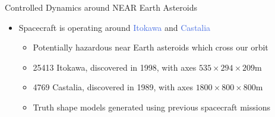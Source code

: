 \documentclass[final, usenames, dvipsnames]{beamer}
\newlength{\twocolwidth}
\def\Emph{\textcolor{RoyalBlue}}
\begin{document}
\begin{frame}[t]
\begin{columns}[T,onlytextwidth]
\begin{column}{\twocolwidth}
\begin{block}{Controlled Dynamics around NEAR Earth Asteroids}
\begin{minipage}{0.5\columnwidth}
\begin{itemize}
	\end{itemize}
	\end{minipage}%
	\begin{minipage}{0.5\columnwidth}%
        \begin{itemize}
            \item Spacecraft is operating around \Emph{Itokawa} and \Emph{Castalia}
            \begin{itemize}
                \item Potentially hazardous near Earth asteroids which cross our orbit 
                \item 25413 Itokawa, discovered in 1998, with axes \( 535 \times 294 \times 209 \si{\meter}\)
                \item 4769 Castalia, discovered in 1989, with axes \( 1800 \times 800 \times 800 \si{\meter}\) 
                \item Truth shape models generated using previous spacecraft missions
            \end{itemize}
        \end{itemize}
        \begin{figure}
            \centering
        \end{figure}
	\end{minipage}%
\end{block} %


\end{column}
\end{columns}
\end{frame}
\end{document}
